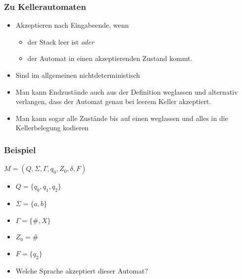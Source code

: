 \begin{frame}
\frametitle{Zu Kellerautomaten}
\begin{itemize}
\item Akzeptieren nach Eingabeende, wenn \begin{itemize}
	\item der Stack leer ist \emph{oder}
	\item der Automat in einen akzeptierenden Zustand kommt.
\end{itemize}
\item Sind im allgemeinen nichtdeterministisch
\item Man kann Endzustände auch aus der Definition weglassen und alternativ verlangen, dass der Automat genau bei leerem Keller akzeptiert.
\item Man kann sogar alle Zustände bis auf einen weglassen und alles in die Kellerbelegung kodieren
\end{itemize}
\end{frame}

\begin{frame}
\frametitle{Beispiel}
$M = (Q, \Sigma, \Gamma, q_0, Z_0, \delta, F)$
\begin{itemize}
\item $Q = \{q_0, q_1, q_2\}$
\item $\Sigma = \{a,b\}$
\item $\Gamma = \{\#,X\}$
\item $Z_0 = \#$
\item $F = \{q_2\}$
\end{itemize}
\begin{figure}
\end{figure}

\begin{itemize}
\item Welche Sprache akzeptiert dieser Automat?
\end{itemize}
\end{frame}

